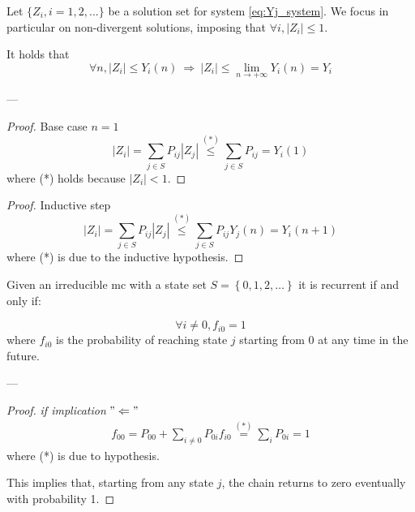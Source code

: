 	\begin{lemma}
		Let $\{Z_i, i=1, 2, ...\}$ be a solution set for system \eqref{eq:Yj_system}. We focus in particular on non-divergent solutions, imposing that $ \forall i, |Z_i| \le 1 $.

		It holds that
		$$ \forall n, |Z_i| \le Y_i(n) ~ \Rightarrow ~|Z_i| \le \lim_{n \to +\infty} Y_i(n) = Y_i $$
	\end{lemma}
	---
	\begin{proof} Base case $n=1$
		$$ |Z_i| = \sum_{j \in S} P_{ij} |Z_j| \stackrel{(*)}{\le} \sum_{j \in S} P_{ij} = Y_i(1) $$
		where (*) holds because $|Z_i| < 1$.
	\end{proof}

	\begin{proof} Inductive step
		$$ |Z_i| = \sum_{j \in S} P_{ij} |Z_j| \stackrel{(*)}{\le} \sum_{j \in S} P_{ij} Y_j(n) = Y_i(n+1) $$
		where (*) is due to the inductive hypothesis.
	\end{proof}

	\begin{lemma}[4.13 (Ross 2, pg. 78-82)] \label{lemma:MC_irreducible_fi0}
		Given an irreducible \gls{mc} with a state set $S=\left\{0,1,2,\dots \right\}$ it is recurrent if and only if:

		$$ \forall i \neq 0, f_{i 0} = 1 $$
		where $f_{i 0}$ is the probability of reaching state $j$ starting from 0 at any time in the future.
	\end{lemma}
	---
	\begin{proof} \emph{if implication} $"\Leftarrow"$
		\begin{equation}\begin{split}
			f_{00} = P_{00} + \sum_{i \neq 0} P_{0i} f_{i 0} \stackrel{(*)}{=} \sum_{i} P_{0i} = 1
		\end{split}\end{equation}
		where (*) is due to hypothesis.

		This implies that, starting from any state $j$, the chain returns to zero eventually with probability 1.
	\end{proof}

